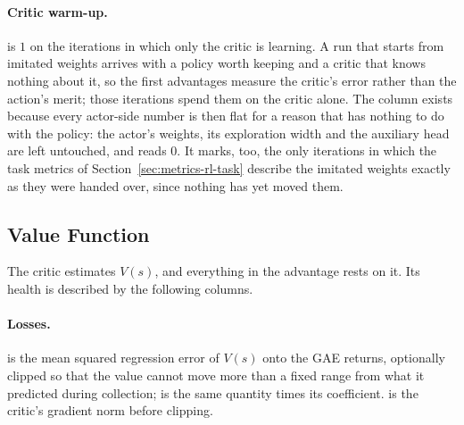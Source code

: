 \paragraph{Critic warm-up.}
 is $1$ on the iterations in which only the critic is
learning. A run that starts from imitated weights arrives with a policy worth
keeping and a critic that knows nothing about it, so the first advantages
measure the critic's error rather than the action's merit; those iterations
spend them on the critic alone. The column exists because every actor-side
number is then flat for a reason that has nothing to do with the policy: the
actor's weights, its exploration width and the auxiliary head are left
untouched, and  reads $0$. It marks, too, the only iterations
in which the task metrics of Section~\ref{sec:metrics-rl-task} describe the
imitated weights exactly as they were handed over, since nothing has yet moved
them.

\subsection{Value Function}
\label{sec:metrics-rl-value}

The critic estimates $V(s)$, and everything in the advantage rests on it. Its
health is described by the following columns.

\paragraph{Losses.}
 is the mean squared regression error of $V(s)$ onto the GAE
returns, optionally clipped so that the value cannot move more than a fixed
range from what it predicted during collection;  is the same
quantity times its coefficient.  is the critic's
gradient norm before clipping.

